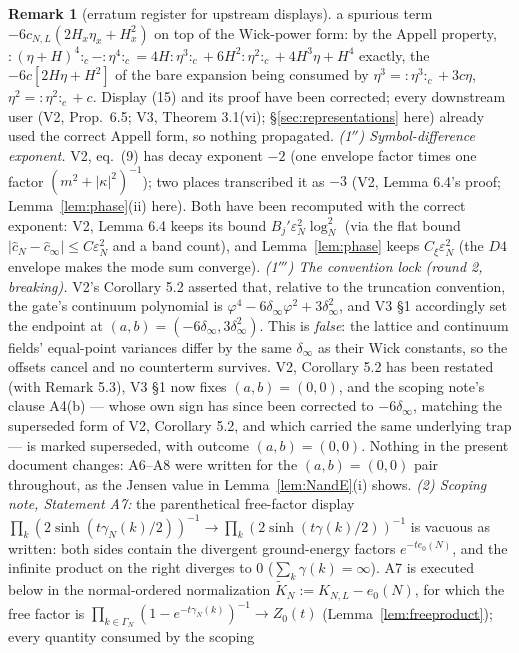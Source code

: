 \documentclass[11pt,a4paper]{article}
\theoremstyle{plain}
\theoremstyle{definition}
\newtheorem{remark}[theorem]{Remark}
\newcommand{\eps}{\varepsilon}
\DeclareMathOperator{\sh}{sinh}
\begin{document}
\begin{remark}[erratum register for upstream displays]
a spurious term $-6c_{N,L}(2H_x\eta_x+H_x^2)$ on top of the Wick-power
form: by the Appell property,
${:}(\eta+H)^4{:}_c-{:}\eta^4{:}_c
=4H{:}\eta^3{:}_c+6H^2{:}\eta^2{:}_c+4H^3\eta+H^4$ exactly, the
$-6c[2H\eta+H^2]$ of the bare expansion being consumed by
$\eta^3={:}\eta^3{:}_c+3c\eta$, $\eta^2={:}\eta^2{:}_c+c$. Display (15) and
its proof have been corrected; every downstream user (V2, Prop.\ 6.5; V3,
Theorem 3.1(vi); \S\ref{sec:representations} here) already used the correct
Appell form, so nothing propagated.
\emph{(1$''$) Symbol-difference exponent.} V2, eq.\ (9) has decay exponent
$-2$ (one envelope factor times one factor $(m^2+|\kappa|^2)^{-1}$); two
places transcribed it as $-3$ (V2, Lemma 6.4's proof;
Lemma~\ref{lem:phase}(ii) here). Both have been recomputed with the correct
exponent: V2, Lemma 6.4 keeps its bound $B_j'\eps_N^2\log_N^2$ (via the flat
bound $|\hat c_N-\hat c_\infty|\le C\eps_N^2$ and a band count), and
Lemma~\ref{lem:phase} keeps $C_\xi\eps_N^2$ (the $D4$ envelope makes the
mode sum converge).
\emph{(1$'''$) The convention lock (round 2, breaking).} V2's Corollary 5.2
asserted that, relative to the truncation convention, the gate's continuum
polynomial is $\varphi^4-6\delta_\infty\varphi^2+3\delta_\infty^2$, and V3 \S1
accordingly set the endpoint at $(a,b)=(-6\delta_\infty,3\delta_\infty^2)$.
This is \emph{false}: the lattice and continuum fields' equal-point variances
differ by the same $\delta_\infty$ as their Wick constants, so the offsets
cancel and no counterterm survives. V2, Corollary 5.2 has been restated
(with Remark 5.3), V3 \S1 now fixes $(a,b)=(0,0)$, and the scoping note's
clause A4(b) --- whose own sign has since been corrected to
$-6\delta_\infty$, matching the superseded form of V2, Corollary 5.2, and
which carried the same underlying trap --- is marked superseded, with
outcome $(a,b)=(0,0)$. Nothing in the present document changes: A6--A8 were
written for the $(a,b)=(0,0)$ pair throughout, as the Jensen value in
Lemma~\ref{lem:NandE}(i) shows.
\emph{(2) Scoping note, Statement A7:} the parenthetical free-factor
display $\prod_k(2\sh(t\gamma_N(k)/2))^{-1}\to
\prod_k(2\sh(t\gamma(k)/2))^{-1}$ is vacuous as written: both sides
contain the divergent ground-energy factors $e^{-te_0(N)}$, and the
infinite product on the right diverges to $0$
($\sum_k\gamma(k)=\infty$). A7 is executed below in the normal-ordered
normalization $\widetilde K_{N}:=K_{N,L}-e_0(N)$, for which the free
factor is $\prod_{k\in\Gamma_N}(1-e^{-t\gamma_N(k)})^{-1}\to Z_0(t)$
(Lemma~\ref{lem:freeproduct}); every quantity consumed by the scoping

\end{remark}
\end{document}
